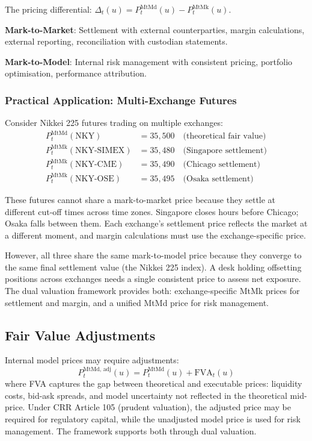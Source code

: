 \documentclass[11pt,a4paper]{article}
\begin{document}
The pricing differential: $\Delta_t(u) = P_t^{\text{MtMd}}(u) - P_t^{\text{MtMk}}(u)$.

\noindent\textbf{Mark-to-Market}: Settlement with external counterparties, margin calculations, external reporting, reconciliation with custodian statements.

\noindent\textbf{Mark-to-Model}: Internal risk management with consistent pricing, portfolio optimisation, performance attribution.

\subsubsection{Practical Application: Multi-Exchange Futures}

Consider Nikkei 225 futures trading on multiple exchanges:
\begin{align*}
P_t^{\text{MtMd}}(\text{NKY}) &= 35{,}500 \quad \text{(theoretical fair value)} \\
P_t^{\text{MtMk}}(\text{NKY-SIMEX}) &= 35{,}480 \quad \text{(Singapore settlement)} \\
P_t^{\text{MtMk}}(\text{NKY-CME}) &= 35{,}490 \quad \text{(Chicago settlement)} \\
P_t^{\text{MtMk}}(\text{NKY-OSE}) &= 35{,}495 \quad \text{(Osaka settlement)}
\end{align*}

These futures cannot share a mark-to-market price because they settle at different cut-off times across time zones. Singapore closes hours before Chicago; Osaka falls between them. Each exchange's settlement price reflects the market at a different moment, and margin calculations must use the exchange-specific price.

However, all three share the same mark-to-model price because they converge to the same final settlement value (the Nikkei 225 index). A desk holding offsetting positions across exchanges needs a single consistent price to assess net exposure. The dual valuation framework provides both: exchange-specific MtMk prices for settlement and margin, and a unified MtMd price for risk management.

\subsection{Fair Value Adjustments}

Internal model prices may require adjustments:
\[
P_t^{\text{MtMd, adj}}(u) = P_t^{\text{MtMd}}(u) + \text{FVA}_t(u)
\]
where FVA captures the gap between theoretical and executable prices: liquidity costs, bid-ask spreads, and model uncertainty not reflected in the theoretical mid-price. Under CRR Article 105 (prudent valuation), the adjusted price may be required for regulatory capital, while the unadjusted model price is used for risk management. The framework supports both through dual valuation.
\end{document}
